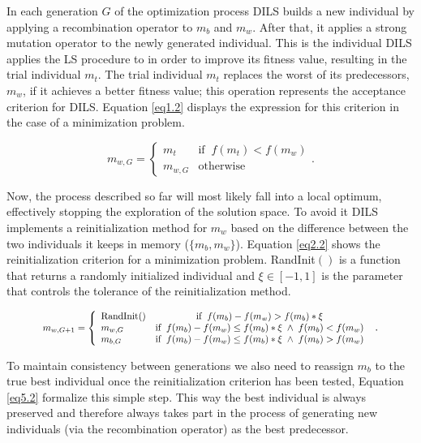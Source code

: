 In each generation $G$ of the optimization process DILS builds a new individual by applying a recombination operator to $m_b$ and $m_w$. After that, it applies a strong mutation operator to the newly generated individual. This is the individual DILS applies the LS procedure to in order to improve its fitness value, resulting in the trial individual $m_t$. The trial individual $m_t$ replaces the worst of its predecessors, $m_w$, if it achieves a better fitness value; this operation represents the acceptance criterion for DILS. Equation \ref{eq1.2} displays the expression for this criterion in the case of a minimization problem.

\begin{equation}
m_{w,G} = \left\{ \begin{array}{lc}
m_t &   \text{if} \;\; f(m_t) < f(m_w)\\
m_{w,G} &  \text{otherwise}
\end{array}
\right..
\label{eq1.2}
\end{equation}

Now, the process described so far will most likely fall into a local optimum, effectively stopping the exploration of the solution space. To avoid it DILS implements a reinitialization method for $m_w$ based on the difference between the two individuals it keeps in memory ($\{m_b, m_w\}$). Equation \ref{eq2.2} shows the reinitialization criterion for a minimization problem. RandInit$()$ is a function that returns a randomly initialized individual and $\xi \in [-1,1]$ is the parameter that controls the tolerance of the reinitialization method.

\begin{equation}
\resizebox{0.85 \textwidth}{!}{$
	m_{w,G+1} = \left\{ \begin{array}{lc}
	\text{RandInit}() &   \text{if} \;\; f(m_b) - f(m_w) > f(m_b) * \xi \;\;\\
	m_{w,G} &  \text{if} \;\; f(m_b) - f(m_w) \le f(m_b) * \xi \; \wedge \; f(m_b) < f(m_w) \;\;\\
	m_{b,G} &  \text{if} \;\; f(m_b) - f(m_w) \le f(m_b) * \xi \; \wedge \; f(m_b) > f(m_w) \;\;\\
	\end{array}
	\right.$}.
\label{eq2.2}
\end{equation}

To maintain consistency between generations we also need to reassign $m_b$ to the true best individual once the reinitialization criterion has been tested, Equation \ref{eq5.2} formalize this simple step. This way the best individual is always preserved and therefore always takes part in the process of generating new individuals (via the recombination operator) as the best predecessor.

